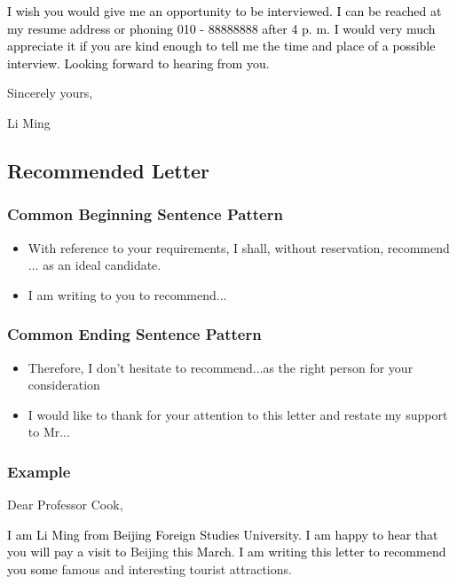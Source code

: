 \documentclass{article}
\begin{document}
\par \textcolor{black}{I wish you would give me an opportunity to be interviewed. I can be reached at my resume address or phoning 010 - 88888888 after 4 p. m. I would very much appreciate it if you are kind enough to tell me the time and place of a possible interview. Looking forward to hearing from you}.

\hfill Sincerely yours,

\hfill Li Ming


\subsection{Recommended Letter}
\label{sec:letter}

\subsubsection{Common Beginning Sentence Pattern}
\label{sec:comm-begnn-sent}
\begin{itemize}
\item With reference to your requirements, I shall, without reservation, recommend ... as
  an ideal candidate.
\item I am writing to you to recommend...  
\end{itemize}

\subsubsection{Common Ending Sentence Pattern}
\label{sec:comm-ending-sent-2}
\begin{itemize}
\item Therefore, I don't hesitate to recommend...as the right person for your
  consideration
\item I would like to thank for your attention to this letter and restate my support to Mr...
\end{itemize}

\subsubsection{Example}
\label{sec:example-2}
Dear Professor Cook,
\par \textcolor{black}{I am Li Ming from Beijing Foreign Studies University. I am happy to
  hear that you will pay a visit to} Beijing \textcolor{black}{this March}. \textcolor{black}{I am
  writing this letter to recommend you some} famous and interesting tourist attractions.
\end{document}
